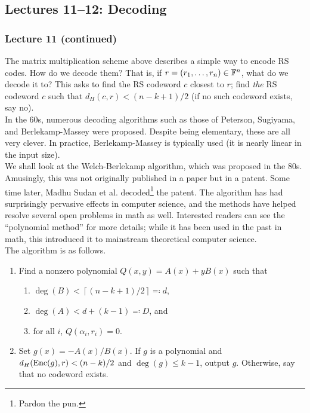 \subsection{Lectures 11--12: Decoding}

	\subsubsection{Lecture 11 (continued)}

		The matrix multiplication scheme above describes a simple way to encode RS codes. How do we decode them? That is, if $r = (r_1,\ldots,r_n) \in \mathbb{F}^n$, what do we decode it to? This asks to find the RS codeword $c$ closest to $r$; find \emph{the} RS codeword $c$ such that $d_H(c,r) < (n-k+1)/2$ (if no such codeword exists, say no). \\ %

		In the 60s, numerous decoding algorithms such as those of Peterson, Sugiyama, and Berlekamp-Massey were proposed. Despite being elementary, these are all very clever. In practice, Berlekamp-Massey is typically used (it is nearly linear in the input size).\\
		We shall look at the Welch-Berlekamp algorithm, which was proposed in the 80s. Amusingly, this was not originally published in a paper but in a patent. Some time later, Madhu Sudan et al. decoded\footnote{Pardon the pun.} the patent. The algorithm has had surprisingly pervasive effects in computer science, and the methods have helped resolve several open problems in math as well. Interested readers can see the ``polynomial method'' for more details; while it has been used in the past in math, this introduced it to mainstream theoretical computer science. \\
		The algorithm is as follows.

		\begin{enumerate}
			\item Find a nonzero polynomial $Q(x,y) = A(x) + yB(x)$ such that
			\begin{enumerate}
				\item $\deg(B) < \left\lceil (n-k+1)/2 \right\rceil \eqqcolon d$,
				\item $\deg(A) < d + (k-1) \eqqcolon D$, and
				\item for all $i$, $Q(\alpha_i,r_i) = 0$.
			\end{enumerate}
			\item Set $g(x) = -A(x)/B(x)$. If $g$ is a polynomial and $d_H(\operatorname{Enc}(g),r) < (n-k)/2$ and $\deg(g) \le k-1$, output $g$. Otherwise, say that no codeword exists.
		\end{enumerate}

